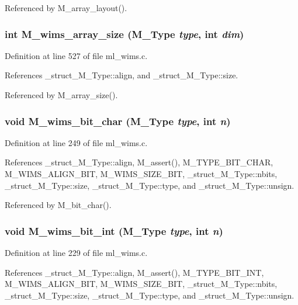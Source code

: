 Referenced by M\_\-array\_\-layout().
\subsubsection{\setlength{\rightskip}{0pt plus 5cm}int M\_\-wims\_\-array\_\-size (\bf{M\_\-Type} {\em type}, int {\em dim})}\label{ml__wims_8c_26f3f696afa4b7e4baae4c32ff22e42d}




Definition at line 527 of file ml\_\-wims.c.

References \_\-struct\_\-M\_\-Type::align, and \_\-struct\_\-M\_\-Type::size.

Referenced by M\_\-array\_\-size().
\subsubsection{\setlength{\rightskip}{0pt plus 5cm}void M\_\-wims\_\-bit\_\-char (\bf{M\_\-Type} {\em type}, int {\em n})}\label{ml__wims_8c_e1b404e7db639f47814075359cdee0de}




Definition at line 249 of file ml\_\-wims.c.

References \_\-struct\_\-M\_\-Type::align, M\_\-assert(), M\_\-TYPE\_\-BIT\_\-CHAR, M\_\-WIMS\_\-ALIGN\_\-BIT, M\_\-WIMS\_\-SIZE\_\-BIT, \_\-struct\_\-M\_\-Type::nbits, \_\-struct\_\-M\_\-Type::size, \_\-struct\_\-M\_\-Type::type, and \_\-struct\_\-M\_\-Type::unsign.

Referenced by M\_\-bit\_\-char().
\subsubsection{\setlength{\rightskip}{0pt plus 5cm}void M\_\-wims\_\-bit\_\-int (\bf{M\_\-Type} {\em type}, int {\em n})}\label{ml__wims_8c_4c6dbdfcc06a2532550db73013f6a63b}




Definition at line 229 of file ml\_\-wims.c.

References \_\-struct\_\-M\_\-Type::align, M\_\-assert(), M\_\-TYPE\_\-BIT\_\-INT, M\_\-WIMS\_\-ALIGN\_\-BIT, M\_\-WIMS\_\-SIZE\_\-BIT, \_\-struct\_\-M\_\-Type::nbits, \_\-struct\_\-M\_\-Type::size, \_\-struct\_\-M\_\-Type::type, and \_\-struct\_\-M\_\-Type::unsign.

